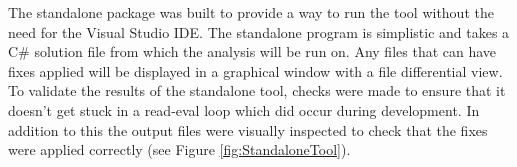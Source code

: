 The standalone package was built to provide a way to run the tool without the need for the Visual Studio IDE. The standalone program is simplistic and takes a C\# solution file from which the analysis will be run on. Any files that can have fixes applied will be displayed in a graphical window with a file differential view. To validate the results of the standalone tool, checks were made to ensure that it doesn't get stuck in a read-eval loop which did occur during development. In addition to this the output files were visually inspected to check that the fixes were applied correctly (see Figure \ref{fig:StandaloneTool}).
